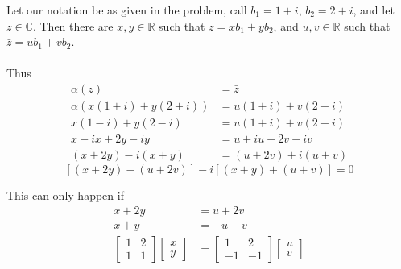\documentclass{article}
\begin{document}
\begin{solution}
Let our notation be as given in the problem, call $b_{1}=1+i$, $b_{2}=2+i$, and let $z\in\mathbb{C}$. Then there are $x,y\in\mathbb{R}$ such that $z = xb_{1} +yb_{2}$, and $u,v\in\mathbb{R}$ such that $\bar{z} = ub_{1} +vb_{2}$.

\paragraph{}
Thus
\begin{align*}
\alpha(z) &= \bar{z} \\
\alpha(x(1+i) +y(2+i)) &= u(1+i) +v(2+i) \\
x(1-i) +y(2-i) &= u(1+i) +v(2+i) \\
x-ix +2y-iy &= u+iu +2v+iv \\
(x+2y)-i(x+y)&= (u+2v)+i(u+v)
\end{align*}
\[ [(x+2y)-(u+2v)]-i[(x+y)+(u+v)] = 0 \]

This can only happen if
\begin{align*}
x+2y &= u+2v \\
x+y &= -u-v \\
\begin{bmatrix}
1 & 2 \\
1 & 1
\end{bmatrix}
\begin{bmatrix}
x\\ y
\end{bmatrix}
&= 
\begin{bmatrix}
1 & 2 \\
-1 & -1
\end{bmatrix}
\begin{bmatrix}
u\\ v
\end{bmatrix}
\end{align*}


\end{solution}
\end{document}
